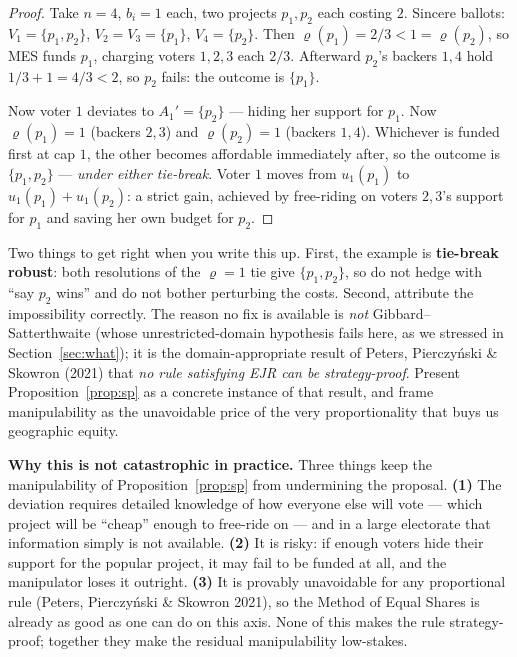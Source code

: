 \documentclass[11pt,letterpaper]{article}
\theoremstyle{definition}
\theoremstyle{plain}
\theoremstyle{remark}
\newcommand{\mesrho}{\varrho}      %
\providecommand{\citet}[1]{Peters, Pierczy\'nski \& Skowron (2021)}
\providecommand{\citealp}[1]{Peters, Pierczy\'nski \& Skowron 2021}
\begin{document}
\begin{proof}
Take $n=4$, $b_i=1$ each, two projects $p_1,p_2$ each costing $2$. Sincere ballots:
$V_1=\{p_1,p_2\}$, $V_2=V_3=\{p_1\}$, $V_4=\{p_2\}$. Then $\mesrho(p_1)=2/3<1=\mesrho(p_2)$, so MES
funds $p_1$, charging voters $1,2,3$ each $2/3$. Afterward $p_2$'s backers $1,4$ hold
$1/3+1=4/3<2$, so $p_2$ fails: the outcome is $\{p_1\}$.

Now voter $1$ deviates to $A_1'=\{p_2\}$ --- hiding her support for $p_1$. Now $\mesrho(p_1)=1$
(backers $2,3$) and $\mesrho(p_2)=1$ (backers $1,4$). Whichever is funded first at cap $1$, the
other becomes affordable immediately after, so the outcome is $\{p_1,p_2\}$ --- \emph{under either
tie-break}. Voter $1$ moves from $u_1(p_1)$ to $u_1(p_1)+u_1(p_2)$: a strict gain, achieved by
free-riding on voters $2,3$'s support for $p_1$ and saving her own budget for $p_2$.
\end{proof}

\begin{watchout}
Two things to get right when you write this up. First, the example is \textbf{tie-break robust}:
both resolutions of the $\mesrho=1$ tie give $\{p_1,p_2\}$, so do not hedge with ``say $p_2$ wins''
and do not bother perturbing the costs. Second, attribute the impossibility correctly. The reason no
fix is available is \emph{not} Gibbard--Satterthwaite (whose unrestricted-domain hypothesis fails
here, as we stressed in Section~\ref{sec:what}); it is the domain-appropriate result of
\citet{peters2021} that \emph{no rule satisfying EJR can be strategy-proof}. Present
Proposition~\ref{prop:sp} as a concrete instance of that result, and frame manipulability as the
unavoidable price of the very proportionality that buys us geographic equity.
\end{watchout}

\begin{aside}\small
\textbf{Why this is not catastrophic in practice.} Three things keep the manipulability of
Proposition~\ref{prop:sp} from undermining the proposal. \textbf{(1)} The deviation requires detailed
knowledge of how everyone else will vote --- which project will be ``cheap'' enough to free-ride on ---
and in a large electorate that information simply is not available. \textbf{(2)} It is risky: if
enough voters hide their support for the popular project, it may fail to be funded at all, and the
manipulator loses it outright. \textbf{(3)} It is provably unavoidable for any proportional rule
(\citealp{peters2021}), so the Method of Equal Shares is already as good as one can do on this axis.
None of this makes the rule strategy-proof; together they make the residual manipulability low-stakes.
\end{aside}
\end{document}
